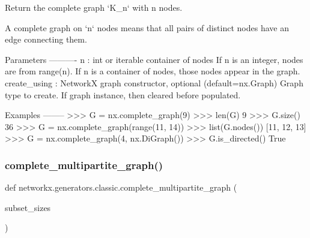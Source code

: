 \begin{DoxyVerb}Return the complete graph `K_n` with n nodes.

A complete graph on `n` nodes means that all pairs
of distinct nodes have an edge connecting them.

Parameters
----------
n : int or iterable container of nodes
    If n is an integer, nodes are from range(n).
    If n is a container of nodes, those nodes appear in the graph.
create_using : NetworkX graph constructor, optional (default=nx.Graph)
   Graph type to create. If graph instance, then cleared before populated.

Examples
--------
>>> G = nx.complete_graph(9)
>>> len(G)
9
>>> G.size()
36
>>> G = nx.complete_graph(range(11, 14))
>>> list(G.nodes())
[11, 12, 13]
>>> G = nx.complete_graph(4, nx.DiGraph())
>>> G.is_directed()
True\end{DoxyVerb}
 \mbox{\label{namespacenetworkx_1_1generators_1_1classic_a40bf451199b8b14c3918b16b93f6fe11}} 
\subsubsection{\texorpdfstring{complete\+\_\+multipartite\+\_\+graph()}{complete\_multipartite\_graph()}}
{\footnotesize\ttfamily def networkx.\+generators.\+classic.\+complete\+\_\+multipartite\+\_\+graph (\begin{DoxyParamCaption}\item[{}]{subset\+\_\+sizes }\end{DoxyParamCaption})}

